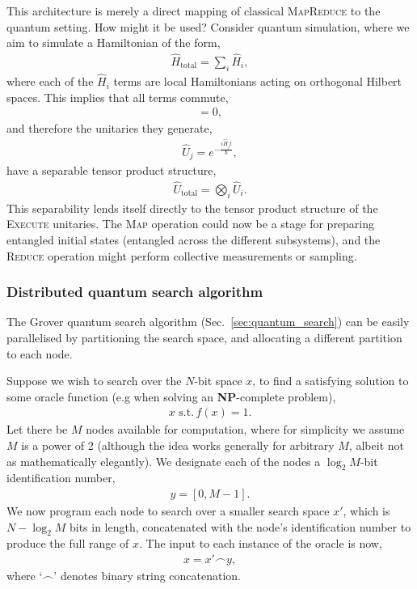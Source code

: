 This architecture is merely a direct mapping of classical \textsc{MapReduce} to the quantum setting. How might it be used? Consider quantum simulation, where we aim to simulate a Hamiltonian of the form,
\begin{align}
\hat{H}_\mathrm{total} = \sum_i \hat{H}_i,	
\end{align}
where each of the $\hat{H}_i$ terms are local Hamiltonians acting on orthogonal Hilbert spaces. This implies that all terms commute,
\begin{align}
[\hat{H}_i,\hat{H}_j]=0,
\end{align}
and therefore the unitaries they generate,
\begin{align}
	\hat{U}_j=e^{-\frac{i\hat{H}_jt}{\hbar}},
\end{align}
have a separable tensor product structure,
\begin{align}
	\hat{U}_\mathrm{total}=\bigotimes_i \hat{U}_i.
\end{align}
This separability lends itself directly to the tensor product structure of the \textsc{Execute} unitaries. The \textsc{Map} operation could now be a stage for preparing entangled initial states (entangled across the different subsystems), and the \textsc{Reduce} operation might perform collective measurements or sampling.


\subsubsection{Distributed quantum search algorithm}

The Grover quantum search algorithm (Sec.~\ref{sec:quantum_search}) can be easily parallelised by partitioning the search space, and allocating a different partition to each node.

Suppose we wish to search over the $N$-bit space $x$, to find a satisfying solution to some oracle function (e.g when solving an \textbf{NP}-complete problem),
\begin{align}
x\,\, \mathrm{s.t.}\, f(x)=1.
\end{align}
Let there be $M$ nodes available for computation, where for simplicity we assume $M$ is a power of 2 (although the idea works generally for arbitrary $M$, albeit not as mathematically elegantly). We designate each of the nodes a $\log_2 M$-bit identification number,
\begin{align}
	y=[0,M-1].
\end{align}
We now program each node to search over a smaller search space $x'$, which is \mbox{$N-\log_2 M$} bits in length, concatenated with the node's identification number to produce the full range of $x$. The input to each instance of the oracle is now,
\begin{align}
x = x'\frown y,
\end{align}
where `$\frown$' denotes binary string concatenation.

